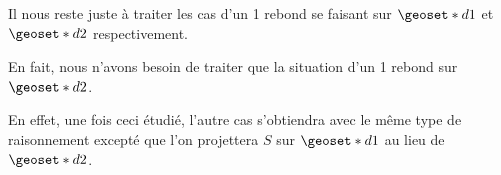 Il nous reste juste à traiter les cas d'un 1\ier{} rebond se faisant sur $\geoset*{d}{1}$ et $\geoset*{d}{2}$ respectivement.

\begin{tcolorbox}
	\centering\itshape
	
	En fait, nous n'avons besoin de traiter que la situation d'un 1\ier{} rebond sur $\geoset*{d}{2}$.
\end{tcolorbox}

En effet, une fois ceci étudié, l'autre cas s'obtiendra avec le même type de raisonnement excepté que l'on projettera $S$ sur $\geoset*{d}{1}$ au lieu de $\geoset*{d}{2}$.
